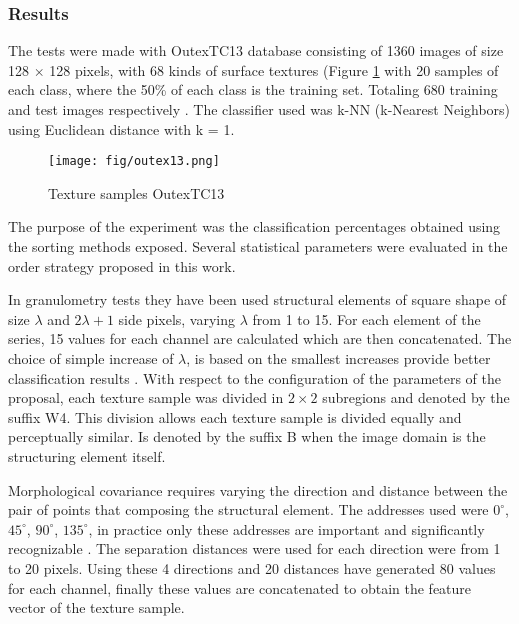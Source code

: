 \subsubsection{Results}
\label{sec:resultadosexperi}
The tests were made with OutexTC13 database consisting of 1360 images of size 128 $\times$ 128 pixels, with 68 kinds of surface textures (Figure \ref{fig:outex13} with 20 samples of each class, where the 50\% of each class is the training set. Totaling 680 training and test images respectively \cite{ojala2002outex}.  
The classifier used was k-NN (k-Nearest Neighbors) using Euclidean distance with k = 1. 

\begin{figure}
	\centering
		\texttt{[image: fig/outex13.png]}
	\caption{Texture samples OutexTC13}
	\label{fig:outex13}
\end{figure}

The purpose of the experiment was the classification percentages obtained using the sorting methods exposed.
Several statistical parameters were evaluated in the order strategy proposed in this work.

In granulometry tests they have been used structural elements of square shape of size  $\lambda$ and $2\lambda+1$ side pixels, varying $\lambda$ from 1 to 15. For each element of the series, 15 values for each channel are calculated which are then concatenated. The choice of simple increase of $\lambda$, is based on the smallest increases provide better classification results \cite{de2006selecting}. 
With respect to the configuration of the parameters of the proposal, each texture sample was divided in $2\times2$  subregions and  denoted by the suffix W4. This division allows each texture sample is divided equally and perceptually similar. Is denoted by the suffix B when the image domain is the structuring element itself. 

Morphological covariance requires varying the direction and distance between the pair of points that composing the structural element. The addresses used were $0^{\circ}$, $45^{\circ}$, $90^{\circ}$,  $135^{\circ}$, in practice only these addresses are important and significantly recognizable \cite{hanbury2005illumination}. The separation distances were used for each direction were from 1 to 20 pixels. Using these 4 directions and 20 distances have generated 80 values for each channel, finally these values are concatenated to obtain the feature vector of the texture sample. 
 

